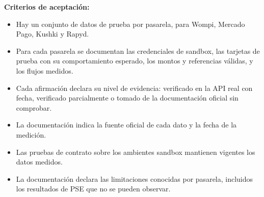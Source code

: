 \textbf{Criterios de aceptación:}
\begin{itemize}
  \item Hay un conjunto de datos de prueba por pasarela, para Wompi, Mercado Pago, Kushki y Rapyd.
  \item Para cada pasarela se documentan las credenciales de sandbox, las tarjetas de prueba con su comportamiento esperado, los montos y referencias válidas, y los flujos medidos.
  \item Cada afirmación declara su nivel de evidencia: verificado en la API real con fecha, verificado parcialmente o tomado de la documentación oficial sin comprobar.
  \item La documentación indica la fuente oficial de cada dato y la fecha de la medición.
  \item Las pruebas de contrato sobre los ambientes sandbox mantienen vigentes los datos medidos.
  \item La documentación declara las limitaciones conocidas por pasarela, incluidos los resultados de PSE que no se pueden observar.
\end{itemize}
